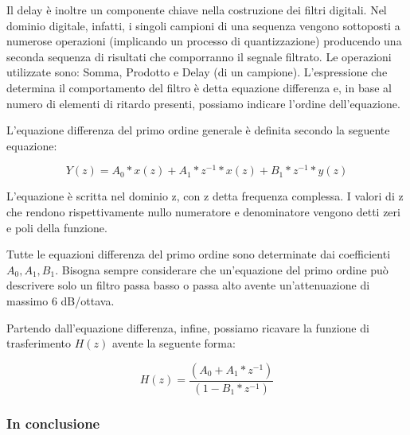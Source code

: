 Il delay è inoltre un componente chiave nella costruzione dei filtri digitali.
Nel dominio digitale, infatti, i singoli campioni di una sequenza vengono sottoposti a numerose operazioni (implicando un processo di quantizzazione) producendo una seconda sequenza di risultati che comporranno il segnale filtrato. 
Le operazioni utilizzate sono: Somma, Prodotto e Delay (di un campione).
L’espressione che determina il comportamento del filtro è detta equazione differenza e, in base al numero di elementi di ritardo presenti, possiamo indicare l’ordine dell’equazione.

L’equazione differenza del primo ordine generale è definita secondo la seguente equazione:

\begin{equation}
Y(z)=A_0*x(z) + A_1*z^{-1}*x(z) + B_1*z^{-1}*y(z)
\end{equation}

L’equazione è scritta nel dominio z, con z detta frequenza complessa.
I valori di z che rendono rispettivamente nullo numeratore e denominatore vengono detti zeri e poli della funzione.

Tutte le equazioni differenza del primo ordine sono determinate dai coefficienti $A_0, A_1,B_1$.
Bisogna sempre considerare che un’equazione del primo ordine può descrivere solo un filtro passa basso o passa alto avente un’attenuazione di massimo 6 dB/ottava.

Partendo dall’equazione differenza, infine, possiamo ricavare la funzione di trasferimento $H(z)$ avente la seguente forma:

\begin{equation}
H(z)=\frac{(A_0 + A_1 * z^{-1})} {(1-B_1 * z^{-1})}
\end{equation}

\subsubsection{In conclusione}
